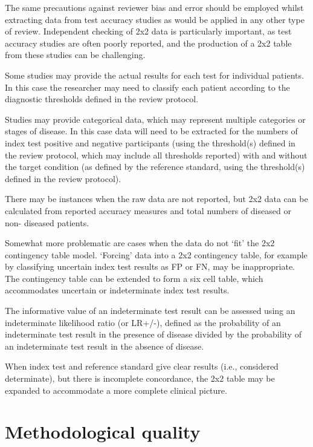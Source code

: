\documentclass[
  11pt,
  a4paper,
  DIV=11,
  numbers=noendperiod]{scrreprt}
\begin{document}
The same precautions against reviewer bias and error should be employed
whilst extracting data from test accuracy studies as would be applied in
any other type of review. Independent checking of 2x2 data is
particularly important, as test accuracy studies are often poorly
reported, and the production of a 2x2 table from these studies can be
challenging.

Some studies may provide the actual results for each test for individual
patients. In this case the researcher may need to classify each patient
according to the diagnostic thresholds defined in the review protocol.

Studies may provide categorical data, which may represent multiple
categories or stages of disease. In this case data will need to be
extracted for the numbers of index test positive and negative
participants (using the threshold(s) defined in the review protocol,
which may include all thresholds reported) with and without the target
condition (as defined by the reference standard, using the threshold(s)
defined in the review protocol).

There may be instances when the raw data are not reported, but 2x2 data
can be calculated from reported accuracy measures and total numbers of
diseased or non- diseased patients.

Somewhat more problematic are cases when the data do not `fit' the 2x2
contingency table model. `Forcing' data into a 2x2 contingency table,
for example by classifying uncertain index test results as FP or FN, may
be inappropriate. The contingency table can be extended to form a six
cell table, which accommodates uncertain or indeterminate index test
results.

The informative value of an indeterminate test result can be assessed
using an indeterminate likelihood ratio (or LR+/-), defined as the
probability of an indeterminate test result in the presence of disease
divided by the probability of an indeterminate test result in the
absence of disease.

When index test and reference standard give clear results (i.e.,
considered determinate), but there is incomplete concordance, the 2x2
table may be expanded to accommodate a more complete clinical picture.

\section{Methodological quality}\label{methodological-quality}
\end{document}
